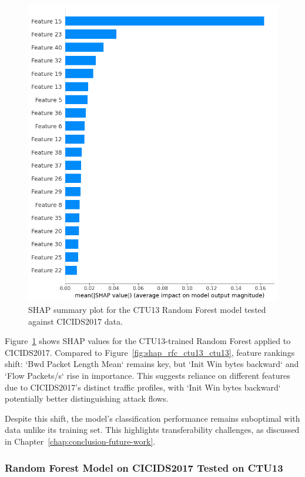 \begin{figure}[H]
\centering
\includegraphics[width=\textwidth]{img/SHAP_RFCTU13_CICIDS2017.png}
\caption{SHAP summary plot for the CTU13 Random Forest model tested against CICIDS2017 data.}\label{fig:shap_rfc_ctu13_cicids2017}
\end{figure}

Figure~\ref{fig:shap_rfc_ctu13_cicids2017} shows SHAP values for the CTU13-trained Random Forest applied to CICIDS2017. Compared to Figure~\ref{fig:shap_rfc_ctu13_ctu13}, feature rankings shift: `Bwd Packet Length Mean` remains key, but `Init Win bytes backward` and `Flow Packets/s` rise in importance. This suggests reliance on different features due to CICIDS2017’s distinct traffic profiles, with `Init Win bytes backward` potentially better distinguishing attack flows.

Despite this shift, the model's classification performance remains suboptimal with data unlike its training set. This highlights transferability challenges, as discussed in Chapter~\ref{chap:conclusion-future-work}.

\subsubsection{Random Forest Model on CICIDS2017 Tested on CTU13}\label{subsec:rf-cicids2017-ctu13}

